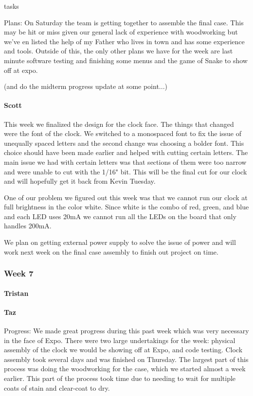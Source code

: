 tasks\documentclass[onecolumn, draftclsnofoot,10pt, compsoc]{IEEEtran}
\begin{document}
Plans: On Saturday the team is getting together to assemble the final case. This may be hit or miss given our general lack of experience with woodworking but we've en listed the help of my Father who lives in town and has some experience and tools. Outside of this, the only other plans we have for the week are last minute software testing and finishing some menus and the game of Snake to show off at expo.

(and do the midterm progress update at some point...)
\paragraph{Scott}
This week we finalized the design for the clock face. The things that changed were the font of the clock. We switched to a monospaced font to fix the issue of unequally spaced letters and the second change was choosing a bolder font. This choice should have been made earlier and helped with cutting certain letters. The main issue we had with certain letters was that sections of them were too narrow and were unable to cut with the 1/16" bit. This will be the final cut for our clock and will hopefully get it back from Kevin Tuesday.

One of our problem we figured out this week was that we cannot run our clock at full brightness in the color white. Since white is the combo of red, green, and blue and each LED uses 20mA we cannot run all the LEDs on the board that only handles 200mA.

We plan on getting external power supply to solve the issue of power and will work next week on the final case assembly to finish out project on time.
\subsubsection{Week 7}
\paragraph{Tristan}

\paragraph{Taz}
Progress: We made great progress during this past week which was very necessary in the face of Expo. There were two large undertakings for the week: physical assembly of the clock we would be showing off at Expo, and code testing. Clock assembly took several days and was finished on Thursday. The largest part of this process was doing the woodworking for the case, which we started almost a week earlier. This part of the process took time due to needing to wait for multiple coats of stain and clear-coat to dry.
\end{document}
